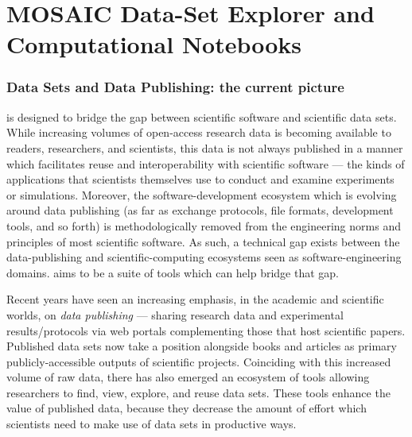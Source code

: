 \documentclass[11pt,letterpaper]{article}
\newcommand{\ATextCClr}[1]{\textcolor{atcColor}{\textbf{#1}}}
\newcommand{\CRtwo}{{\resizebox{!}{7.5pt}{\ATextCClr{CR2}}}}
\newcommand{\lMOSAIC}{%
\resizebox{!}{8pt}{\AcronymText{M}}%
\resizebox{!}{6pt}{\AcronymText{OSAIC}}}
\newcommand{\textscc}[1]{{\color{orr!35!black}{{%
						\fontfamily{Cabin-TLF}\fontseries{b}\selectfont{\textsc{\scriptsize{#1}}}}}}}
\newcommand{\AcronymText}[1]{{\textscc{#1}}}
\newcommand{\PDF}{\resizebox{!}{7pt}{\AcronymText{PDF}}}
\newcommand{\p}[1]{

\vspace{1em}#1}
\begin{document}
{%


\part{MOSAIC Data-Set Explorer and Computational Notebooks}


\section{Data Sets and Data Publishing: the current picture}

\p{\lMOSAIC{} is designed to bridge the 
gap between scientific software and 
scientific data sets.  While increasing 
volumes of open-access research data is 
becoming available to readers, researchers, 
and scientists, this data is not always 
published in a manner which facilitates 
reuse and interoperability with scientific 
software --- the kinds of applications 
that scientists themselves use to conduct 
and examine experiments or simulations.  
Moreover, the software-development ecosystem 
which is evolving around data publishing 
(as far as exchange protocols, file formats, 
development tools, and so forth) is  
methodologically removed from the engineering 
norms and principles of most scientific 
software.  As such, a technical gap 
exists between the data-publishing and 
scientific-computing ecosystems seen 
as software-engineering domains.  
\lMOSAIC{} aims to be a suite of tools 
which can help bridge that gap.}

\p{Recent years have seen an increasing emphasis, 
in the academic and scientific worlds, on 
\textit{data publishing} --- sharing research 
data and experimental results/protocols via 
web portals complementing those that host 
scientific papers.  Published data sets 
now take a position alongside books and articles 
as primary publicly-accessible outputs of 
scientific projects.  Coinciding with this 
increased volume of raw data, there has 
also emerged an ecosystem of tools allowing 
researchers to find, view, explore, and 
reuse data sets.  These tools enhance the 
value of published data, because they decrease 
the amount of effort which scientists need 
to make use of data sets in productive ways.}

}
\end{document}
